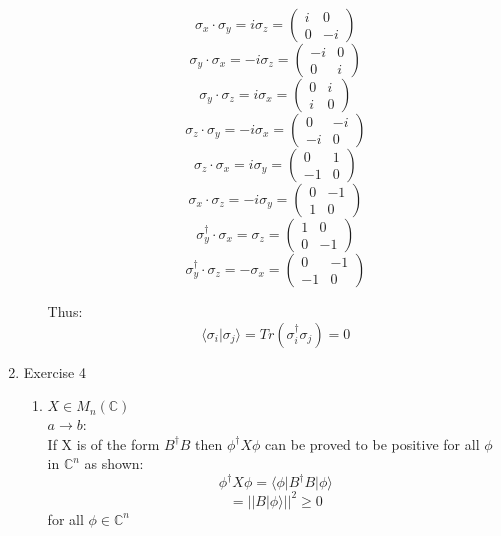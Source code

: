\documentclass[12pt]{article}
\newcommand{\ket}[1]{\vert{#1}\rangle}
\newcommand{\bra}[1]{\langle{#1}\vert}
\begin{document}
\begin{enumerate}
\begin{enumerate}
    $$ \sigma_x \cdot \sigma_y = i\sigma_z = \left( \begin{array}{cc} i & 0 \\ 0 & -i \end{array} \right) $$
    $$ \sigma_y \cdot \sigma_x = -i\sigma_z = \left( \begin{array}{cc} -i & 0 \\ 0 & i \end{array} \right) $$
    $$ \sigma_y \cdot \sigma_z = i\sigma_x = \left( \begin{array}{cc} 0 & i \\ i & 0 \end{array} \right) $$
    $$ \sigma_z \cdot \sigma_y = -i\sigma_x = \left( \begin{array}{cc} 0 & -i \\ -i & 0 \end{array} \right) $$
    $$ \sigma_z \cdot \sigma_x = i\sigma_y = \left( \begin{array}{cc} 0 & 1 \\ -1 & 0 \end{array} \right) $$
    $$ \sigma_x \cdot \sigma_z = -i\sigma_y = \left( \begin{array}{cc} 0 & -1 \\ 1 & 0 \end{array} \right) $$
    $$ \sigma_y^\dagger \cdot \sigma_x = \sigma_z = \left( \begin{array}{cc} 1 & 0 \\ 0 & -1 \end{array} \right) $$
    $$ \sigma_y^\dagger \cdot \sigma_z = -\sigma_x = \left( \begin{array}{cc} 0 & -1 \\ -1 & 0 \end{array} \right) $$

    Thus:
    $$ \langle \sigma_i | \sigma_j \rangle = Tr(\sigma_i^\dagger \sigma_j) =0$$

\end{enumerate}


\item Exercise 4

\begin{enumerate}
    \item $X \in M_n(\mathbb{C})$ 
    \\
    $a \rightarrow b$:
    \\
    If X is of the form $B^\dagger B$ then $\phi^\dagger X \phi$ can be proved to be positive for all $\phi$ in $\mathbb{C}^n$ as shown:
    $$ \phi^\dagger X \phi = \bra{\phi}B^\dagger B\ket{\phi} $$
    $$ = || B \ket{\phi} || ^2 \geq 0 $$ for all $\phi \in \mathbb{C}^n$ 


\end{enumerate}
\end{enumerate}
\end{document}
